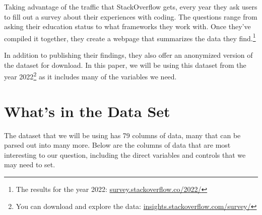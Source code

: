 \documentclass{report}
\begin{document}
Taking advantage of the traffic that StackOverflow gets, every year they ask users to fill out a survey about their experiences with coding. The questions range from asking their education status to what frameworks they work with. Once they've compiled it together, they create a webpage that summarizes the data they find.\footnote{The results for the year 2022: \href{https://survey.stackoverflow.co/2022/}{survey.stackoverflow.co/2022/}}

In addition to publishing their findings, they also offer an anonymized version of the dataset for download. In this paper, we will be using this dataset from the year 2022\footnote{You can download and explore the data: \href{https://insights.stackoverflow.com/survey/}{insights.stackoverflow.com/survey/}} as it includes many of the variables we need.

\section{What's in the Data Set}

The dataset that we will be using has 79 columns of data, many that can be parsed out into many more. Below are the columns of data that are most interesting to our question, including the direct variables and controls that we may need to set.
\end{document}
